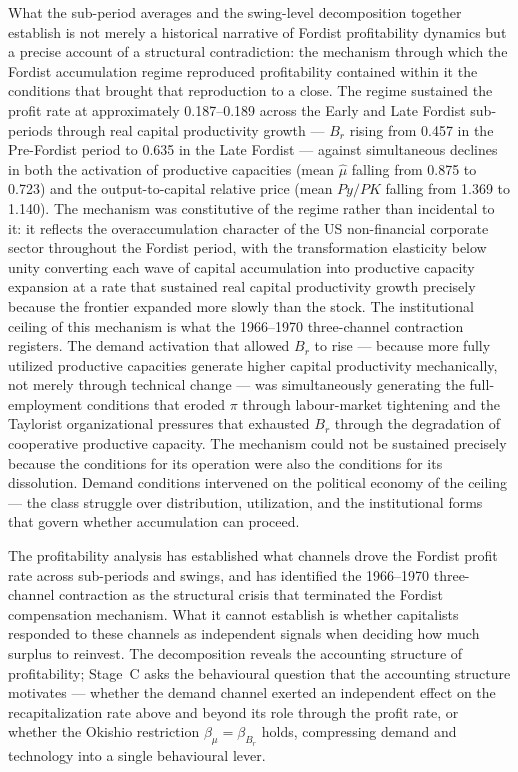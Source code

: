 What the sub-period averages and the swing-level decomposition together
establish is not merely a historical narrative of Fordist profitability
dynamics but a precise account of a structural contradiction: the
mechanism through which the Fordist accumulation regime reproduced
profitability contained within it the conditions that brought that
reproduction to a close. The regime sustained the profit rate at
approximately 0.187--0.189 across the Early and Late Fordist sub-periods
through real capital productivity growth --- $B_{r}$ rising from 0.457
in the Pre-Fordist period to 0.635 in the Late Fordist --- against
simultaneous declines in both the activation of productive capacities
(mean $\hat{\mu}$ falling from 0.875 to 0.723) and the output-to-capital
relative price (mean $Py/PK$ falling from 1.369 to 1.140). The mechanism
was constitutive of the regime rather than incidental to it: it reflects
the overaccumulation character of the US non-financial corporate sector
throughout the Fordist period, with the transformation elasticity below
unity converting each wave of capital accumulation into productive
capacity expansion at a rate that sustained real capital productivity
growth precisely because the frontier expanded more slowly than the stock.
The institutional ceiling of this mechanism is what the 1966--1970
three-channel contraction registers. The demand activation that allowed
$B_{r}$ to rise --- because more fully utilized productive capacities
generate higher capital productivity mechanically, not merely through
technical change --- was simultaneously generating the full-employment
conditions that eroded $\pi$ through labour-market tightening and
the Taylorist organizational pressures that exhausted $B_{r}$ through
the degradation of cooperative productive capacity. The mechanism could
not be sustained precisely because the conditions for its operation
were also the conditions for its dissolution. Demand conditions
intervened on the political economy of the ceiling --- the class struggle
over distribution, utilization, and the institutional forms that govern
whether accumulation can proceed.


The profitability analysis has established what channels drove the Fordist
profit rate across sub-periods and swings, and has identified the
1966--1970 three-channel contraction as the structural crisis that
terminated the Fordist compensation mechanism. What it cannot establish
is whether capitalists responded to these channels as independent
signals when deciding how much surplus to reinvest. The decomposition
reveals the accounting structure of profitability; Stage~C asks the
behavioural question that the accounting structure motivates --- whether
the demand channel exerted an independent effect on the recapitalization
rate above and beyond its role through the profit rate, or whether the
Okishio restriction $\beta_{\mu} = \beta_{B_{r}}$ holds, compressing
demand and technology into a single behavioural lever.
